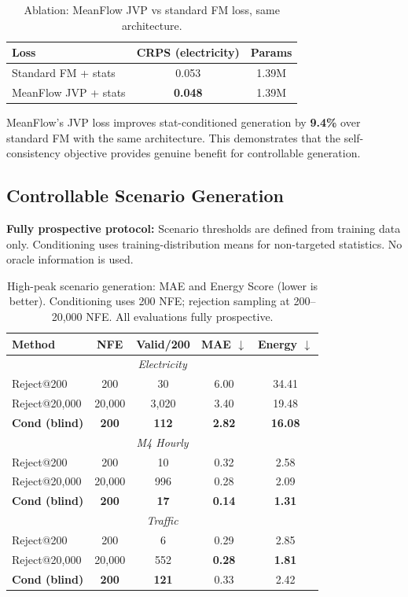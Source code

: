 \documentclass{article}
\begin{document}
\begin{table}[h]
\centering
\caption{Ablation: MeanFlow JVP vs standard FM loss, same architecture.}
\begin{tabular}{lcc}
\toprule
Loss & CRPS (electricity) & Params \\
\midrule
Standard FM + stats & 0.053 & 1.39M \\
MeanFlow JVP + stats & \textbf{0.048} & 1.39M \\
\bottomrule
\end{tabular}
\label{tab:ablation}
\end{table}

MeanFlow's JVP loss improves stat-conditioned generation by \textbf{9.4\%} over standard FM with the same architecture. This demonstrates that the self-consistency objective provides genuine benefit for controllable generation.

\subsection{Controllable Scenario Generation}

\textbf{Fully prospective protocol:} Scenario thresholds are defined from training data only. Conditioning uses training-distribution means for non-targeted statistics. No oracle information is used.

\begin{table}[h]
\centering
\caption{High-peak scenario generation: MAE and Energy Score (lower is better). Conditioning uses 200 NFE; rejection sampling at 200--20,000 NFE. All evaluations fully prospective.}
\begin{tabular}{lcccc}
\toprule
Method & NFE & Valid/200 & MAE $\downarrow$ & Energy $\downarrow$ \\
\midrule
\multicolumn{5}{c}{\textit{Electricity}} \\
\midrule
Reject@200 & 200 & 30 & 6.00 & 34.41 \\
Reject@20,000 & 20,000 & 3,020 & 3.40 & 19.48 \\
\textbf{Cond (blind)} & \textbf{200} & \textbf{112} & \textbf{2.82} & \textbf{16.08} \\
\midrule
\multicolumn{5}{c}{\textit{M4 Hourly}} \\
\midrule
Reject@200 & 200 & 10 & 0.32 & 2.58 \\
Reject@20,000 & 20,000 & 996 & 0.28 & 2.09 \\
\textbf{Cond (blind)} & \textbf{200} & \textbf{17} & \textbf{0.14} & \textbf{1.31} \\
\midrule
\multicolumn{5}{c}{\textit{Traffic}} \\
\midrule
Reject@200 & 200 & 6 & 0.29 & 2.85 \\
Reject@20,000 & 20,000 & 552 & \textbf{0.28} & \textbf{1.81} \\
\textbf{Cond (blind)} & \textbf{200} & \textbf{121} & 0.33 & 2.42 \\
\bottomrule
\end{tabular}
\label{tab:scenarios}
\end{table}
\end{document}
